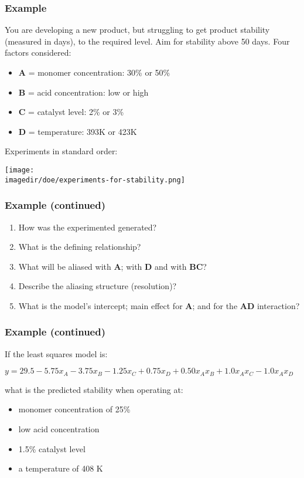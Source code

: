 \begin{frame}\frametitle{Example}

	You are developing a new product, but struggling to get product stability (measured in days), to the required level. Aim for stability above 50 days. Four factors considered:
	\begin{itemize}
		\item	\textbf{A} = monomer concentration: 30\% or 50\%
		\item	\textbf{B} = acid concentration: low or high
		\item	\textbf{C} = catalyst level: 2\% or 3\%
		\item	\textbf{D} = temperature: 393K or 423K
	\end{itemize}

	Experiments in standard order:
	\begin{center}
		\texttt{[image: \\imagedir/doe/experiments-for-stability.png]}
	\end{center}
\end{frame}

\begin{frame}\frametitle{Example (continued)}
	\begin{enumerate}
		\item	How was the experimented generated?
		\item	What is the defining relationship?
		\item	What will be aliased with \textbf{A}; with \textbf{D} and with \textbf{BC}?
		\item	Describe the aliasing structure (resolution)?
		\item	What is the model's intercept; main effect for \textbf{A}; and for the \textbf{AD} interaction?
	\end{enumerate}
\end{frame}

\begin{frame}\frametitle{Example (continued)}

	If the least squares model is:

	$ y = 29.5 -5.75x_A -3.75 x_B -1.25 x_C + 0.75 x_D + 0.50 x_A x_B + 1.0 x_A x_C - 1.0 x_A x_D$

	what is the predicted stability when operating at:
	\begin{itemize}
		\item	monomer concentration of 25\%
		\item	low acid concentration
		\item	1.5\% catalyst level
		\item	a temperature of 408 K
	\end{itemize}
\end{frame}

